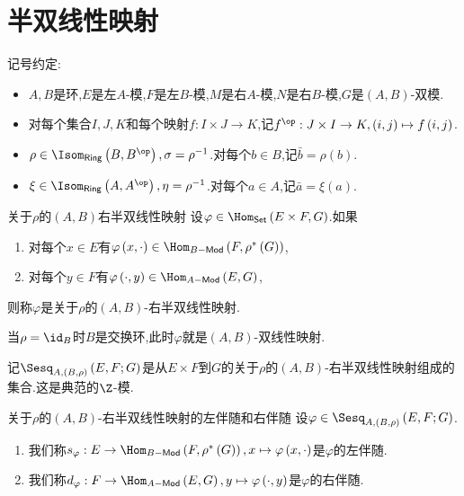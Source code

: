 \section{半双线性映射}

记号约定:
\begin{itemize}
	\item $A,B$是环,$E$是左$A$-模,$F$是左$B$-模,$M$是右$A$-模,$N$是右$B$-模,$G$是$\left(A,B\right)$-双模.
	\item 对每个集合$I,J,K$和每个映射$f:I\times J\to K$,记$f^{\op}:J\times I\to K,\left(i,j\right)\mapsto f\left(i,j\right)$.
	\item $\rho\in\Isom_{\mathsf{Ring}}\left(B,B^{\op}\right),\sigma=\rho^{-1}$.对每个$b\in B$,记$\bar{b}=\rho\left(b\right)$.
	\item $\xi\in\Isom_{\mathsf{Ring}}\left(A,A^{\op}\right),\eta=\rho^{-1}$.对每个$a\in A$,记$\bar{a}=\xi\left(a\right)$.
\end{itemize}

\begin{definition}{关于$\rho$的$\left(A,B\right)$右半双线性映射}{}
	设$\varphi\in\Hom_{\mathsf{Set}}\left(E\times F,G\right)$.如果
	\begin{enumerate}
		\item 对每个$x\in E$有$\varphi\left(x,\cdot\right)\in\Hom_{B-\mathsf{Mod}}\left(F,\rho^{\ast}\left(G\right)\right)$,
		\item 对每个$y\in F$有$\varphi\left(\cdot,y\right)\in\Hom_{A-\mathsf{Mod}}\left(E,G\right)$,
	\end{enumerate}
	则称$\varphi$是关于$\rho$的$\left(A,B\right)$-右半双线性映射.
\end{definition}

\begin{remark}{}{}
	当$\rho=\id_{B}$时$B$是交换环,此时$\varphi$就是$\left(A,B\right)$-双线性映射.
\end{remark}

\begin{definition}{}{}
	记$\Sesq_{A,(B,\rho)}\left(E,F;G\right)$是从$E\times F$到$G$的关于$\rho$的$\left(A,B\right)$-右半双线性映射组成的集合.这是典范的$\Z$-模.
\end{definition}

\begin{definition}{关于$\rho$的$\left(A,B\right)$-右半双线性映射的左伴随和右伴随}{}
	设$\varphi\in\Sesq_{A,(B,\rho)}\left(E,F;G\right)$.
	\begin{enumerate}
		\item 我们称$s_{\varphi}:E\to\Hom_{B-\mathsf{Mod}}\left(F,\rho^{\ast}\left(G\right)\right),x\mapsto\varphi\left(x,\cdot\right)$是$\varphi$的左伴随.
		\item 我们称$d_{\varphi}:F\to\Hom_{A-\mathsf{Mod}}\left(E,G\right),y\mapsto\varphi\left(\cdot,y\right)$是$\varphi$的右伴随.
	\end{enumerate}
\end{definition}

